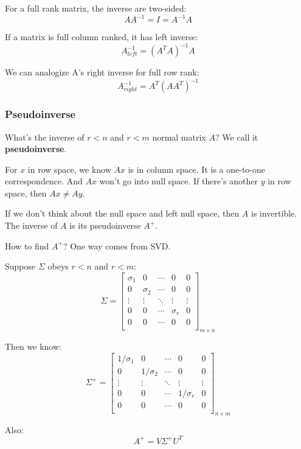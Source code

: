 \documentclass[12pt]{ctexart}
\begin{document}
For a full rank matrix, the inverse are two-sided:
\[
  AA^{-1} = I = A^{-1}A
\]

If a matrix is full column ranked, it has left inverse:
\[
  A^{-1}_{left} = (A^{T}A)^{-1}A
\]

We can analogize A's right inverse for full row rank:
\[
  A^{-1}_{right} = A^{T}(AA^{T})^{-1}
\]

\subsubsection{\textbf{Pseudoinverse}}

What's the inverse of $r < n $ and $r < m$ normal matrix $A$? We call it \textbf{pseudoinverse}.

For $x$ in row space, we know $Ax$ is in column space. It is a one-to-one correspondence. And
$Ax$ won't go into null space. If there's another $y$ in row space, then $Ax \neq Ay$.

If we don't think about the null space and left null space, then $A$ is invertible. The inverse
of $A$ is its pseudoinverse $A^{+}$.

How to find $A^{+}$? One way comes from SVD.

Suppose $\Sigma$ obeys $r < n$ and $r < m$:
\[
  \Sigma = \begin{bmatrix}
    \sigma_1 & 0 & \cdots & 0 & 0 \\
    0 & \sigma_2 & \cdots & 0 & 0 \\
    \vdots & \vdots & \ddots & \vdots & \vdots \\
    0 & 0 & \cdots & \sigma_r & 0 \\
    0 & 0 & \cdots & 0 & 0 \\
    \end{bmatrix}_{m \times n}
\]

Then we know:
\[
  \Sigma^{+} = \begin{bmatrix}
    1/\sigma_1 & 0 & \cdots & 0 & 0 \\
    0 & 1/\sigma_2 & \cdots & 0 & 0 \\
    \vdots & \vdots & \ddots & \vdots & \vdots \\
    0 & 0 & \cdots & 1/\sigma_r & 0 \\
    0 & 0 & \cdots & 0 & 0 \\
    \end{bmatrix}_{n \times m}
\]

Also:
\[
  A^{+} = V\Sigma^{+}U^{T}
\]
\end{document}
